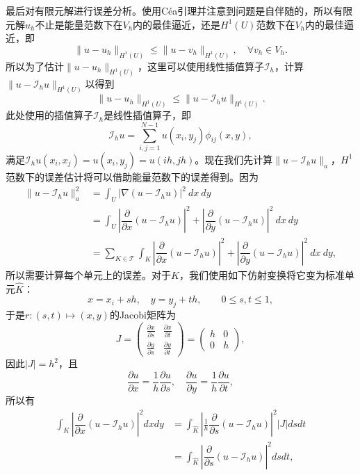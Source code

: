 \documentclass[a4paper,10pt]{ctexart}
\begin{document}
最后对有限元解进行误差分析。使用Céa引理并注意到问题是自伴随的，所以有限元解$ u_h $不止是能量范数下在$ V_h $内的最佳逼近，还是$ H^1(U) $范数下在$ V_h $内的最佳逼近，即
\[
    \| u-u_h \|_{H^1(U)} \leqslant \| u-v_h \|_{H^1(U)},\quad \forall v_h\in V_h.
\]
所以为了估计$ \| u-u_h \|_{H^1(U)} $，这里可以使用线性插值算子$ \mathcal{I}_h $，计算$ \| u-\mathcal{I}_h u \|_{H^1(U)} $以得到
\[
    \| u-u_h \|_{H^1(U)} \leqslant \| u-\mathcal{I}_h u \|_{H^1(U)}.
\]
此处使用的插值算子$ \mathcal{I}_h $是线性插值算子，即
\[
    \mathcal{I}_h u = \sum_{i,j=1}^{N-1} u(x_i,y_j)\phi_{ij}(x,y),
\]
满足$ \mathcal{I}_h u(x_i,x_j) = u(x_i,y_j) = u(ih,jh) $。现在我们先计算$ \| u-\mathcal{I}_h u \|_a $，$ H^1 $范数下的误差估计将可以借助能量范数下的误差得到。因为
\[
    \begin{aligned}
        \| u-\mathcal{I}_h u \|_a^2 &= \int_U |\nabla(u-\mathcal{I}_h u)|^2\ dx\ dy\\
        &= \int_U \left\vert \dfrac{\partial }{\partial x}(u-\mathcal{I}_h u) \right\vert^2 + \left\vert \dfrac{\partial }{\partial y}(u-\mathcal{I}_h u) \right\vert^2\ dx\ dy\\
        &= \sum_{K\in \mathcal{T}} \int_K \left\vert \dfrac{\partial }{\partial x}(u-\mathcal{I}_h u) \right\vert^2 + \left\vert \dfrac{\partial }{\partial y}(u-\mathcal{I}_h u) \right\vert^2\ dx\ dy,
    \end{aligned}
\]
所以需要计算每个单元上的误差。对于$ K $，我们使用如下仿射变换将它变为标准单元$ \hat{K} $：
\[
    x = x_i + sh,\quad y = y_j + th,\qquad 0\leqslant s,t\leqslant 1,
\]
于是$ r:(s,t)\mapsto (x,y) $的Jacobi矩阵为
\[
    J = \begin{pmatrix} 
        \frac{\partial x}{\partial s} & \frac{\partial x}{\partial t}\\
        \frac{\partial y}{\partial s} & \frac{\partial y}{\partial t} 
    \end{pmatrix} = 
    \begin{pmatrix} 
        h & 0\\
        0 & h
    \end{pmatrix},
\]
因此$ |J|=h^2 $，且
\[
    \dfrac{\partial u}{\partial x} = \frac{1}{h} \dfrac{\partial u}{\partial s},\quad \dfrac{\partial u}{\partial y} = \frac{1}{h} \dfrac{\partial u}{\partial t},  
\]
所以有
\[
    \begin{aligned}
        \int_K \left\vert \dfrac{\partial }{\partial x} (u-\mathcal{I}_h u) \right\vert^2 dxdy 
        &= \int_{\hat{K}} \left\vert \frac{1}{h}\dfrac{\partial }{\partial s} (u-\mathcal{I}_h u) \right\vert^2 |J| dsdt\\
        &= \int_{\hat{K}} \left\vert \dfrac{\partial }{\partial s} (u-\mathcal{I}_h u) \right\vert^2 dsdt,
    \end{aligned}
\]
\end{document}
